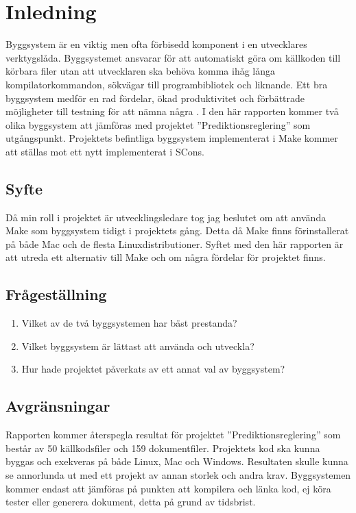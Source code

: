 \section{Inledning}
Byggsystem är en viktig men ofta förbisedd komponent i en utvecklares verktygslåda. Byggsystemet ansvarar för att automatiskt göra om källkoden till körbara filer utan att utvecklaren ska behöva komma ihåg långa kompilatorkommandon, sökvägar till programbibliotek och liknande. Ett bra byggsystem medför en rad fördelar, ökad produktivitet och förbättrade möjligheter till testning för att nämna några \citep{pragmaticautomation}.
\newline
\newline
I den här rapporten kommer två olika byggsystem att jämföras med projektet ''Prediktionsreglering'' som utgångspunkt. Projektets befintliga byggsystem implementerat i Make kommer att ställas mot ett nytt implementerat i SCons. 

\subsection{Syfte}
Då min roll i projektet är utvecklingsledare tog jag beslutet om att använda Make som byggsystem tidigt i projektets gång. Detta då Make finns förinstallerat på både Mac och de flesta Linuxdistributioner. Syftet med den här rapporten är att utreda ett alternativ till Make och om några fördelar för projektet finns.

\subsection{Frågeställning} \label{avsnitt:fragestallning}

\begin{enumerate}
\item Vilket av de två byggsystemen har bäst prestanda?
\item Vilket byggsystem är lättast att använda och utveckla?
\item Hur hade projektet påverkats av ett annat val av byggsystem?
\end{enumerate}

\subsection{Avgränsningar} \label{avsnitt:avgransningar}
Rapporten kommer återspegla resultat för projektet ''Prediktionsreglering'' som består av 50 källkodsfiler och 159 dokumentfiler. Projektets kod ska kunna byggas och exekveras på både Linux, Mac och Windows. Resultaten skulle kunna se annorlunda ut med ett projekt av annan storlek och andra krav. Byggsystemen kommer endast att jämföras på punkten att kompilera och länka kod, ej köra tester eller generera dokument, detta på grund av tidsbrist.
